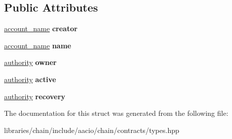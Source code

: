 \subsection*{Public Attributes}
\begin{DoxyCompactItemize}
\item 
\mbox{\label{structaacio_1_1chain_1_1contracts_1_1newaccount_aa6b95870b51ec92f39b239380e1e1e81}} 
\mbox{\hyperlink{structaacio_1_1chain_1_1name}{account\+\_\+name}} {\bfseries creator}
\item 
\mbox{\label{structaacio_1_1chain_1_1contracts_1_1newaccount_a7ebe17ddf4e2a2d9fba274bce92c3652}} 
\mbox{\hyperlink{structaacio_1_1chain_1_1name}{account\+\_\+name}} {\bfseries name}
\item 
\mbox{\label{structaacio_1_1chain_1_1contracts_1_1newaccount_a2ec6fbef274eb307144afce36d4895f0}} 
\mbox{\hyperlink{structaacio_1_1chain_1_1authority}{authority}} {\bfseries owner}
\item 
\mbox{\label{structaacio_1_1chain_1_1contracts_1_1newaccount_af29a3f9142834e23c5a886c81d9eeb73}} 
\mbox{\hyperlink{structaacio_1_1chain_1_1authority}{authority}} {\bfseries active}
\item 
\mbox{\label{structaacio_1_1chain_1_1contracts_1_1newaccount_ab8061da3c1863d3d170b93431c5e118e}} 
\mbox{\hyperlink{structaacio_1_1chain_1_1authority}{authority}} {\bfseries recovery}
\end{DoxyCompactItemize}


The documentation for this struct was generated from the following file\+:\begin{DoxyCompactItemize}
\item 
libraries/chain/include/aacio/chain/contracts/types.\+hpp\end{DoxyCompactItemize}
